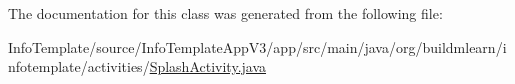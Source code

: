 The documentation for this class was generated from the following file\+:\begin{DoxyCompactItemize}
\item 
Info\+Template/source/\+Info\+Template\+App\+V3/app/src/main/java/org/buildmlearn/infotemplate/activities/\hyperlink{InfoTemplate_2source_2InfoTemplateAppV3_2app_2src_2main_2java_2org_2buildmlearn_2infotemplate_2activities_2SplashActivity_8java}{Splash\+Activity.\+java}\end{DoxyCompactItemize}
